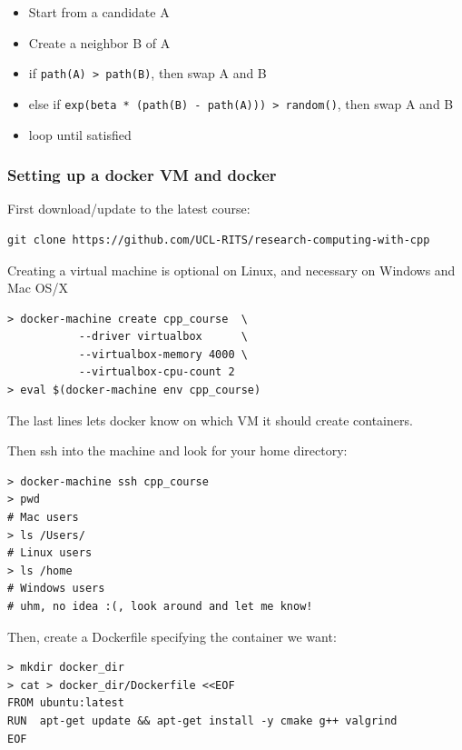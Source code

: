 \begin{itemize}
\itemsep1pt\parskip0pt
\item
  Start from a candidate A
\item
  Create a neighbor B of A
\item
  if \texttt{path(A) \textgreater{} path(B)}, then swap A and B
\item
  else if
  \texttt{exp(beta * (path(B) - path(A))) \textgreater{} random()}, then
  swap A and B
\item
  loop until satisfied
\end{itemize}

\subsubsection{Setting up a docker VM and
docker}\label{setting-up-a-docker-vm-and-docker}

First download/update to the latest course:

\begin{verbatim}
git clone https://github.com/UCL-RITS/research-computing-with-cpp
\end{verbatim}

Creating a virtual machine is optional on Linux, and necessary on
Windows and Mac OS/X

\begin{verbatim}
> docker-machine create cpp_course  \
           --driver virtualbox      \
           --virtualbox-memory 4000 \
           --virtualbox-cpu-count 2
> eval $(docker-machine env cpp_course)
\end{verbatim}

The last lines lets docker know on which VM it should create containers.

Then ssh into the machine and look for your home directory:

\begin{verbatim}
> docker-machine ssh cpp_course
> pwd
# Mac users
> ls /Users/
# Linux users
> ls /home
# Windows users
# uhm, no idea :(, look around and let me know!
\end{verbatim}

Then, create a Dockerfile specifying the container we want:

\begin{verbatim}
> mkdir docker_dir
> cat > docker_dir/Dockerfile <<EOF
FROM ubuntu:latest
RUN  apt-get update && apt-get install -y cmake g++ valgrind
EOF
\end{verbatim}

